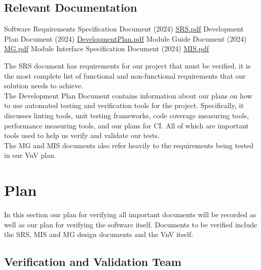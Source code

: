 \documentclass[12pt, titlepage]{article}
\begin{document}
\subsection{Relevant Documentation}

\begin{thebibliography}{9}
   Software Requirements Specification Document (2024)
  \href{../SRS-Volere/SRS.pdf}{SRS.pdf}
   Development Plan Document (2024)
  \href{../DevelopmentPlan/DevelopmentPlan.pdf}{DevelopmentPlan.pdf}
   Module Guide Document (2024)
  \href{../Design/SoftArchitecture/MG.pdf}{MG.pdf}
   Module Interface Specification Document (2024)
  \href{../Design/SoftDetailedDes/MIS.pdf}{MIS.pdf}
  \\
\end{thebibliography}

The SRS document has requirements for our project that must be verified, it is
the most complete list of functional and non-functional requirements that our
solution needs to achieve.\\

The Development Plan Document contains information about our plans on how to use 
automated testing and verification tools for the project. Specifically, it discusses
linting tools, unit testing frameworks, code coverage measuring tools, performance
measuring tools, and our plans for CI. All of which are important tools used to 
help us verify and validate our tests.\\

The MG and MIS documents also refer heavily to the requirements being tested
in our VnV plan.

\section{Plan}

In this section our plan for verifying all important documents will be
recorded as well as our plan for verifying the software itself. Documents to
be verified include the SRS, MIS and MG design documents and the VnV itself.

\subsection{Verification and Validation Team}
\end{document}
